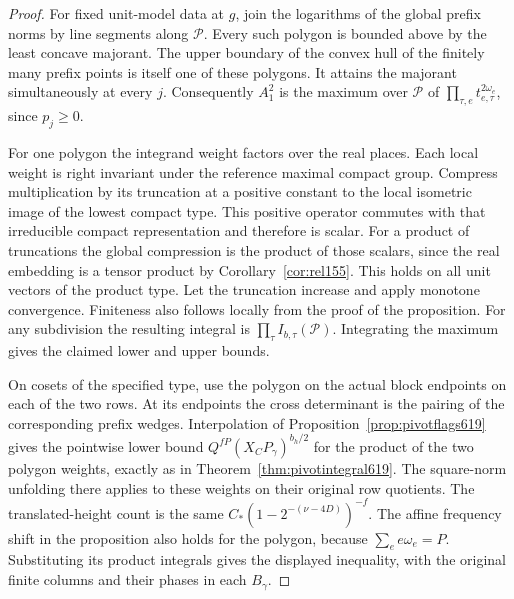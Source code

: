 \documentclass[a4paper,11pt]{article}
\theoremstyle{definition}
\theoremstyle{remark}
\numberwithin{equation}{section}
\begin{document}
\begin{proof}
For fixed unit-model data at \(g\), join the logarithms of
the global prefix norms by line segments along \(\mathcal P\).
Every such polygon is bounded above by the least concave
majorant. The upper boundary of the convex hull of the
finitely many prefix points is itself one of these polygons.
It attains the majorant simultaneously at every \(j\).
Consequently \(A_1^2\) is the maximum over \(\mathcal P\) of
\(\prod_{\tau,e}t_{e,\tau}^{2\omega_e}\), since \(p_j\ge0\).

For one polygon the integrand weight factors over the real
places. Each local weight is right invariant under the
reference maximal compact group. Compress multiplication by
its truncation at a positive constant to the local isometric
image of the lowest compact type. This positive operator
commutes with that irreducible compact representation and
therefore is scalar. For a product of truncations the global
compression is the product of those scalars, since the real
embedding is a tensor product by Corollary~\ref{cor:rel155}.
This holds on all unit vectors of the product type. Let the
truncation increase and apply monotone convergence. Finiteness
also follows locally from the proof of the proposition.
For any subdivision the resulting integral is
\(\prod_\tau I_{b,\tau}(\mathcal P)\). Integrating the maximum
gives the claimed lower and upper bounds.

On cosets of the specified type, use the polygon on the actual
block endpoints on each of the two rows. At its endpoints the
cross determinant is the pairing of the corresponding prefix
wedges. Interpolation of Proposition~\ref{prop:pivotflags619}
gives the pointwise lower bound
\(Q^{fP}(X_C P_\gamma)^{b_h/2}\) for the product of the two
polygon weights, exactly as in Theorem~\ref{thm:pivotintegral619}.
The square-norm unfolding there applies to these weights on
their original row quotients. The translated-height count is
the same \(C_*(1-2^{-(\nu-4D)})^{-f}\). The affine frequency
shift in the proposition also holds for the polygon, because
\(\sum_e e\omega_e=P\). Substituting its product integrals gives
the displayed inequality, with the original finite columns and
their phases in each \(B_\gamma\).
\end{proof}
\end{document}
